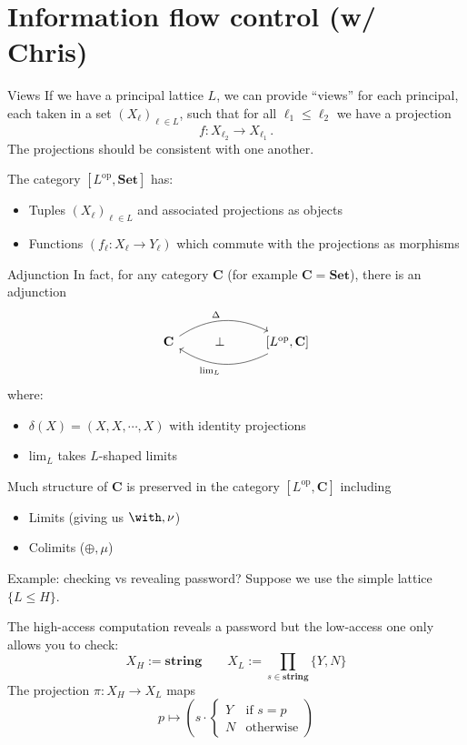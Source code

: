 \documentclass[aspectratio=1610,mathserif]{beamer}
\begin{document}

\section{Information flow control (w/ Chris)} %
\frame\sectionpage

\begin{frame}{Views}
  If we have a principal lattice $L$,
  we can provide ``views'' for each principal,
  each taken in a set $(X_\ell)_{\ell \in L}$,
  such that for all $\ell_1 \le \ell_2$
  we have a projection
  \[ f : X_{\ell_2} \rightarrow X_{\ell_1}  \,. \]
  The projections should be consistent with one another.

  \vspace{1em}
  The category $[L^\mathrm{op}, \mathbf{Set}]$ has:
  \begin{itemize}
    \item Tuples $(X_\ell)_{\ell \in L}$ and associated projections
      as objects
    \item Functions $(f_\ell : X_\ell \rightarrow Y_\ell)$
      which commute with the projections as morphisms
  \end{itemize}
\end{frame}

\begin{frame}[fragile]{Adjunction}
  In fact, for any category $\mathbf{C}$
  (for example $\mathbf{C} = \mathbf{Set}$),
  there is an adjunction
  \[
    \begin{tikzcd}
      \mathbf{C} \ar[rr, bend left, "\Delta"] &
      \bot &
      {[L^\mathrm{op}, \mathbf{C}]} \ar[ll, bend left, "{\mathrm{lim}_L}"]
    \end{tikzcd}
  \]
  where:
  \begin{itemize}
    \item $\delta(X) = (X, X, \cdots, X)$ with identity projections
    \item $\mathrm{lim}_L$ takes $L$-shaped limits
  \end{itemize}
  Much structure of $\mathbf{C}$
  is preserved in the category $[L^\mathrm{op}, \mathbf{C}]$ including
  \begin{itemize}
    \item Limits (giving us $\with, \nu$)
    \item Colimits ($\oplus, \mu$)
  \end{itemize}
\end{frame}

\begin{frame}{Example: checking vs revealing password?}
  Suppose we use the simple lattice $\{L \le H\}$.

  \vspace{1em}
  The high-access computation reveals a password but
  the low-access one only allows you to check:
  \[
    X_H := \mathbf{string} \qquad
    X_L := \prod_{s \in \mathbf{string}} \{Y,N\}
  \]
  The projection $\pi : X_H \rightarrow X_L$ maps
  \[
    p \mapsto \left( s \cdot 
      \begin{cases} Y &\text{if } s = p \\
		    N &\text{otherwise} \end{cases}
    \right)
  \]
\end{frame}
\end{document}
